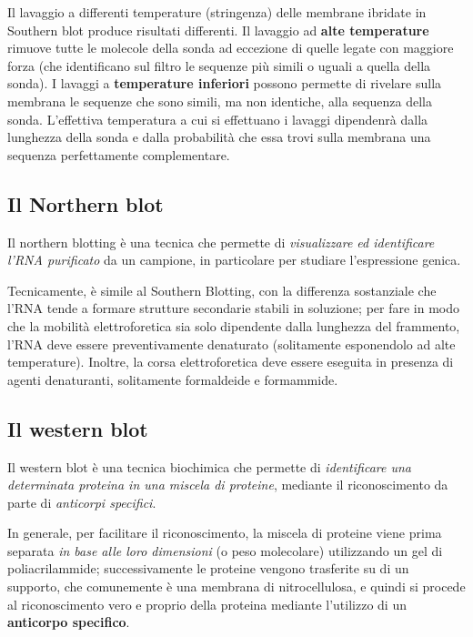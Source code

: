 \documentclass[11pt]{book}
\begin{document}
Il lavaggio a differenti temperature (stringenza) delle membrane
ibridate in Southern blot produce risultati differenti. Il lavaggio ad
\textbf{alte temperature} rimuove tutte le molecole della sonda ad
eccezione di quelle legate con maggiore forza (che identificano sul
filtro le sequenze più simili o uguali a quella della sonda). I lavaggi
a \textbf{temperature inferiori} possono permette di rivelare sulla
membrana le sequenze che sono simili, ma non identiche, alla sequenza
della sonda. L'effettiva temperatura a cui si effettuano i lavaggi
dipendenrà dalla lunghezza della sonda e dalla probabilità che essa
trovi sulla membrana una sequenza perfettamente complementare.

\subsection{Il Northern blot}\label{il-northern-blot}

Il northern blotting è una tecnica che permette di \emph{visualizzare ed
identificare l'RNA purificato} da un campione, in particolare per
studiare l'espressione genica.

Tecnicamente, è simile al Southern Blotting, con la differenza
sostanziale che l'RNA tende a formare strutture secondarie stabili in
soluzione; per fare in modo che la mobilità elettroforetica sia solo
dipendente dalla lunghezza del frammento, l'RNA deve essere
preventivamente denaturato (solitamente esponendolo ad alte
temperature). Inoltre, la corsa elettroforetica deve essere eseguita in
presenza di agenti denaturanti, solitamente formaldeide e formammide.

\subsection{Il western blot}\label{il-western-blot}

Il western blot è una tecnica biochimica che permette di
\emph{identificare una determinata proteina in una miscela di proteine},
mediante il riconoscimento da parte di \emph{anticorpi specifici}.

In generale, per facilitare il riconoscimento, la miscela di proteine
viene prima separata \emph{in base alle loro dimensioni} (o peso
molecolare) utilizzando un gel di poliacrilammide; successivamente le
proteine vengono trasferite su di un supporto, che comunemente è una
membrana di nitrocellulosa, e quindi si procede al riconoscimento vero e
proprio della proteina mediante l'utilizzo di un \textbf{anticorpo
specifico}.
\end{document}
